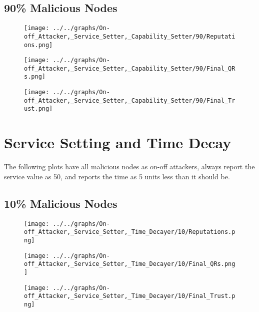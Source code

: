 \begin{minipage}[t]{0.49\columnwidth}
\subsection*{90\% Malicious Nodes}
    \begin{figure}[H]
        \centering
        \texttt{[image: ../../graphs/On-off\_Attacker,\_Service\_Setter,\_Capability\_Setter/90/Reputations.png]}
    \end{figure}
    \begin{figure}[H]
        \centering
        \texttt{[image: ../../graphs/On-off\_Attacker,\_Service\_Setter,\_Capability\_Setter/90/Final\_QRs.png]}
    \end{figure}
\end{minipage}
\begin{minipage}[t]{0.49\columnwidth}
    \begin{figure}[H]
        \centering
        \texttt{[image: ../../graphs/On-off\_Attacker,\_Service\_Setter,\_Capability\_Setter/90/Final\_Trust.png]}
    \end{figure}
\end{minipage}
\newpage

\section*{Service Setting and Time Decay}
The following plots have all malicious nodes as on-off attackers, always
report the service value as 50, and reports the time as 5 units less than
it should be.
\\
\begin{minipage}[t]{0.49\columnwidth}
\subsection*{10\% Malicious Nodes}
    \begin{figure}[H]
        \centering
        \texttt{[image: ../../graphs/On-off\_Attacker,\_Service\_Setter,\_Time\_Decayer/10/Reputations.png]}
    \end{figure}
    \begin{figure}[H]
        \centering
        \texttt{[image: ../../graphs/On-off\_Attacker,\_Service\_Setter,\_Time\_Decayer/10/Final\_QRs.png]}
    \end{figure}
\end{minipage}
\begin{minipage}[t]{0.49\columnwidth}
    \begin{figure}[H]
        \centering
        \texttt{[image: ../../graphs/On-off\_Attacker,\_Service\_Setter,\_Time\_Decayer/10/Final\_Trust.png]}
    \end{figure}
\end{minipage}

